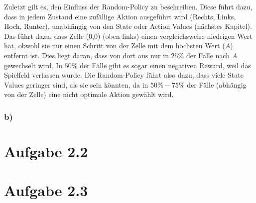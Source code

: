 \documentclass[11pt]{article}
\begin{document}
Zuletzt gilt es, den Einfluss der Random-Policy zu beschreiben. Diese führt dazu, dass in jedem Zustand eine zufällige Aktion ausgeführt wird (Rechts, Links, Hoch, Runter), unabhängig von den State oder Action Values (nächstes Kapitel). Das führt dazu, dass Zelle (0,0) (oben links) einen vergleichsweise niedrigen Wert hat, obwohl sie nur einen Schritt von der Zelle mit dem höchsten Wert ($A$) entfernt ist. Dies liegt daran, dass von dort aus nur in $25\%$ der Fälle nach $A$ gewechselt wird. In $50\%$ der Fälle gibt es sogar einen negativen Reward, weil das Spielfeld verlassen wurde. Die Random-Policy führt also dazu, dass viele State Values geringer sind, als sie sein könnten, da in $50\%-75\%$ der Fälle (abhängig von der Zelle) eine nicht optimale Aktion gewählt wird.

\subsubsection*{b)}

\section*{Aufgabe 2.2}
\section*{Aufgabe 2.3}
\end{document}
